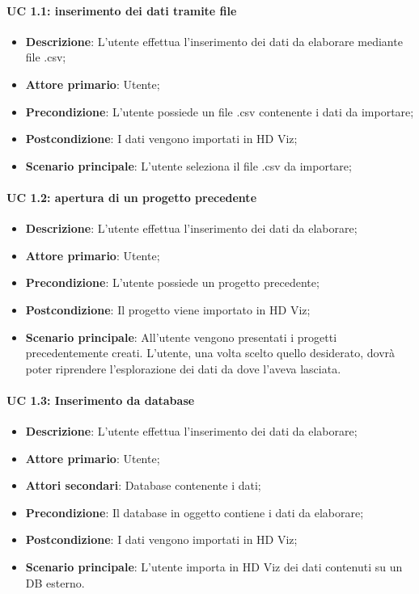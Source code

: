 \paragraph{UC 1.1: inserimento dei dati tramite file}
\begin{itemize}
    \item{\textbf{Descrizione}}: L'utente effettua l'inserimento dei dati da elaborare mediante file .csv;
    \item{\textbf{Attore primario}}: Utente;
    \item{\textbf{Precondizione}}: L'utente possiede un file .csv contenente i dati da importare;
    \item{\textbf{Postcondizione}}: I dati vengono importati in HD Viz;
    \item{\textbf{Scenario principale}}: L'utente seleziona il file .csv da importare;
\end{itemize}

\paragraph{UC 1.2: apertura di un progetto precedente}
\begin{itemize}
    \item{\textbf{Descrizione}}: L'utente effettua l'inserimento dei dati da elaborare;
    \item{\textbf{Attore primario}}: Utente;
    \item{\textbf{Precondizione}}: L'utente possiede un progetto precedente;
    \item{\textbf{Postcondizione}}: Il progetto viene importato in HD Viz;
    \item{\textbf{Scenario principale}}: All'utente vengono presentati i progetti precedentemente creati. L'utente, una volta scelto quello desiderato, dovrà poter riprendere l'esplorazione dei dati da dove l'aveva lasciata.
\end{itemize}

\paragraph{UC 1.3: Inserimento da database}
\begin{itemize}
    \item{\textbf{Descrizione}}: L'utente effettua l'inserimento dei dati da elaborare;
    \item{\textbf{Attore primario}}: Utente;
    \item{\textbf{Attori secondari}}: Database contenente i dati;
    \item{\textbf{Precondizione}}: Il database in oggetto contiene i dati da elaborare;
    \item{\textbf{Postcondizione}}: I dati vengono importati in HD Viz;
    \item{\textbf{Scenario principale}}: L'utente importa in HD Viz dei dati contenuti su un DB esterno.
\end{itemize}
